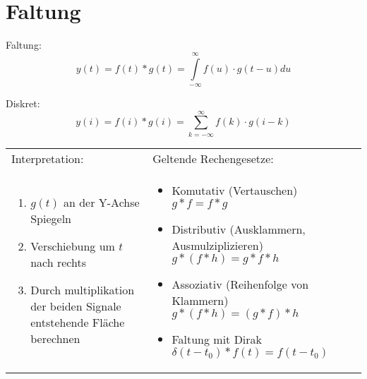 \section{Faltung}
Faltung:
\begin{equation}
  \nonumber
  y(t) = f(t) \ast g(t) = \int\limits_{-\infty}^{\infty}f(u) \cdot g(t-u) du
\end{equation}

Diskret:
\begin{equation}
  \nonumber
  y(i)=f(i) \ast g(i)=\sum\limits_{k=-\infty}^{\infty}f(k)\cdot g(i-k)
\end{equation}

\begin{tabular}{p{9cm}p{9cm}}
  Interpretation: & Geltende Rechengesetze:\\
  \begin{enumerate}
    \item $g(t)$ an der Y-Achse Spiegeln
	  \item Verschiebung um $t$ nach rechts
	  \item Durch multiplikation der beiden Signale entstehende Fläche berechnen
  \end{enumerate}
&
  \begin{itemize}
    \item Komutativ (Vertauschen) $g \ast f = f \ast g $
	  \item Distributiv (Ausklammern, Ausmulziplizieren) $g \ast(f \ast h) = g \ast f \ast h$
	  \item Assoziativ (Reihenfolge von Klammern) $g \ast(f \ast h) = (g \ast f) \ast h$
	  \item Faltung mit Dirak $\delta(t-t_0) \ast f(t) = f(t-t_0)$
  \end{itemize}
\end{tabular}
	
	
	

